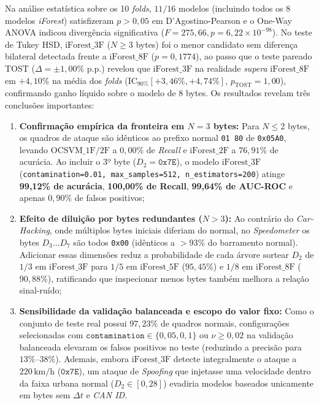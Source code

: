 \documentclass[conference]{IEEEtran}
\begin{document}
Na análise estatística sobre os 10 \textit{folds}, $11/16$ modelos (incluindo todos os 8 modelos \textit{iForest}) satisfizeram $p > 0{,}05$ em D'Agostino-Pearson e o One-Way ANOVA indicou divergência significativa ($F = 275{,}66, p = 6{,}22 \times 10^{-98}$). No teste de Tukey HSD, $\text{iForest\_3F}$ ($N \ge 3$ bytes) foi o menor candidato sem diferença bilateral detectada frente a $\text{iForest\_8F}$ ($p = 0{,}1774$), ao passo que o teste pareado TOST ($\Delta = \pm 1{,}00\%$ p.p.) revelou que $\text{iForest\_3F}$ na realidade \emph{supera} $\text{iForest\_8F}$ em $+4{,}10\%$ na média dos \textit{folds} ($\text{IC}_{90\%} [+3{,}46\%, +4{,}74\%]$, $p_{\text{TOST}}=1{,}00$), confirmando ganho líquido sobre o modelo de 8 bytes. Os resultados revelam três conclusões importantes:
\begin{enumerate}
    \item \textbf{Confirmação empírica da fronteira em $N=3$ bytes:} Para $N \le 2$ bytes, os quadros de ataque são idênticos ao prefixo normal \texttt{01 80} de \texttt{0x05A0}, levando $\text{OCSVM\_1F}/\text{2F}$ a $0{,}00\%$ de \textit{Recall} e $\text{iForest\_2F}$ a $76{,}91\%$ de acurácia. Ao incluir o 3º byte ($D_2 = \texttt{0x7E}$), o modelo $\text{iForest\_3F}$ (\texttt{contamination=0.01, max\_samples=512, n\_estimators=200}) atinge \textbf{99,12\% de acurácia}, \textbf{100,00\% de Recall}, \textbf{99,64\% de AUC-ROC} e apenas $0{,}90\%$ de falsos positivos;
    \item \textbf{Efeito de diluição por bytes redundantes ($N > 3$):} Ao contrário do \textit{Car-Hacking}, onde múltiplos bytes iniciais diferiam do normal, no \textit{Speedometer} os bytes $D_3 \dots D_7$ são todos \texttt{0x00} (idênticos a $>93\%$ do barramento normal). Adicionar essas dimensões reduz a probabilidade de cada árvore sortear $D_2$ de $1/3$ em $\text{iForest\_3F}$ para $1/5$ em $\text{iForest\_5F}$ ($95{,}45\%$) e $1/8$ em $\text{iForest\_8F}$ ($90{,}88\%$), ratificando que inspecionar menos bytes também melhora a relação sinal-ruído;
    \item \textbf{Sensibilidade da validação balanceada e escopo do valor fixo:} Como o conjunto de teste real possui $97{,}23\%$ de quadros normais, configurações selecionadas com $\texttt{contamination} \in \{0{,}05, 0{,}1\}$ ou $\nu \ge 0{,}02$ na validação balanceada elevaram os falsos positivos no teste (reduzindo a precisão para $13\%\text{--}38\%$). Ademais, embora $\text{iForest\_3F}$ detecte integralmente o ataque a $220\,\text{km/h}$ ($\texttt{0x7E}$), um ataque de \textit{Spoofing} que injetasse uma velocidade dentro da faixa urbana normal ($D_2 \in [0, 28]$) evadiria modelos baseados unicamente em bytes sem $\Delta t$ e \textit{CAN ID}.
\end{enumerate}
\end{document}
